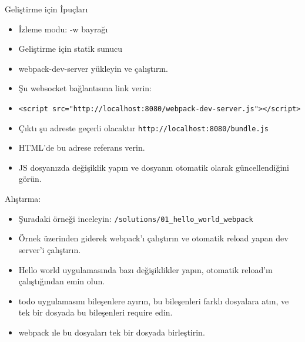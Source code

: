 \documentclass[presentation]{beamer}
\begin{document}
\begin{frame}[fragile,label=sec-12]{Geliştirme için İpuçları}
 \begin{itemize}
\item İzleme modu: -w bayrağı
\item Geliştirme için statik sunucu

\item webpack-dev-server yükleyin ve çalıştırın.

\item Şu websocket bağlantısına link verin:

\item \verb~<script src="http://localhost:8080/webpack-dev-server.js"></script>~

\item Çıktı şu adreste geçerli olacaktır \texttt{http://localhost:8080/bundle.js}

\item HTML'de bu adrese referans verin.

\item JS dosyanızda değişiklik yapın ve dosyanın otomatik olarak güncellendiğini görün.
\end{itemize}
\end{frame}

\begin{frame}[fragile,label=sec-13]{Alıştırma:}
 \begin{itemize}
\item Şuradaki örneği inceleyin: \texttt{/solutions/01\_hello\_world\_webpack}
\item Örnek üzerinden giderek webpack'ı çalıştırın ve otomatik reload yapan dev
server'i çalıştırın.
\item Hello world uygulamasında bazı değişiklikler yapın, otomatik reload'ın
çalıştığından emin olun.
\item todo uygulamasını bileşenlere ayırın, bu bileşenleri farklı dosyalara atın,
ve tek bir dosyada bu bileşenleri require edin.
\item webpack ıle bu dosyaları tek bir dosyada birleştirin.
\end{itemize}
\end{frame}
\end{document}
